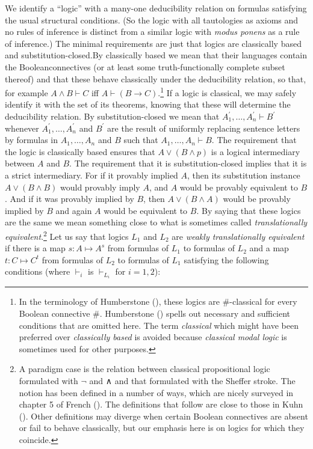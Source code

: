 \documentclass[
  10pt,
  letterpaper,
  DIV=11,
  numbers=noendperiod,
  twoside]{scrartcl}
\begin{document}
We identify a ``logic'' with a many-one deducibility relation on
formulas satisfying the usual structural conditions. (So the logic with
all tautologies as axioms and no rules of inference is distinct from a
similar logic with \emph{modus ponens} as a rule of inference.) The
minimal requirements are just that logics are classically based and
substitution-closed.By classically based we mean that their languages
contain the Booleanconnectives (or at least some truth-functionally
complete subset thereof) and that these behave classically under the
deducibility relation, so that, for example \(A \wedge B \vdash C\) iff
\(A \vdash (B \rightarrow C)\).\footnote{In the terminology of
  Humberstone (), these logics
  are \(\#\)-classical for every Boolean connective \(\#\). Humberstone
  () spells out necessary and
  sufficient conditions that are omitted here. The term \emph{classical}
  which might have been preferred over \emph{classically based} is
  avoided because \emph{classical modal logic} is sometimes used for
  other purposes.} If a logic is classical, we may safely identify it
with the set of its theorems, knowing that these will determine the
deducibility relation. By substitution-closed we mean that
\(A_1^\prime,{\ldots},A_n^\prime \vdash B^\prime\) whenever
\(A_1^\prime,{\ldots},A_n^\prime\) and \(B^\prime\) are the result of
uniformly replacing sentence letters by formulas in \(A_1,{\ldots},A_n\)
and \(B\) such that \(A_1,{\ldots},A_n \vdash B\). The requirement that
the logic is classically based ensures that \(A\vee (B\wedge p)\) is a
logical intermediary between \(A\) and \(B\). The requirement that it is
substitution-closed implies that it is a strict intermediary. For if it
provably implied \(A\), then its substitution instance
\(A\vee (B\wedge B)\) would provably imply \(A\), and \(A\) would be
provably equivalent to \(B\). And if it was provably implied by \(B\),
then \(A\vee (B\wedge A)\) would be provably implied by \(B\) and again
\(A\) would be equivalent to \(B\). By saying that these logics are the
same we mean something close to what is sometimes called
\emph{translationally equivalent}.\footnote{A paradigm case is the
  relation between classical propositional logic formulated with
  \(\neg\) and ∧ and that formulated with the Sheffer stroke. The notion
  has been defined in a number of ways, which are nicely surveyed in
  chapter 5 of French (). The definitions
  that follow are close to those in Kuhn
  (). Other definitions may diverge when
  certain Boolean connectives are absent or fail to behave classically,
  but our emphasis here is on logics for which they coincide.} Let us
say that logics \(L_1\) and \(L_2\) are \emph{weakly translationally
equivalent} if there is a map \(s\colon A{\mapsto}A^s\) from formulas of
\(L_1\) to formulas of \(L_2\) and a map \(t\colon C{\mapsto}C^t\) from
formulas of \(L_2\) to formulas of \(L_1\) satisfying the following
conditions (where \(\vdash_i\) is \(\vdash_{L_i}\) for \(i=1,2\)):
\end{document}
